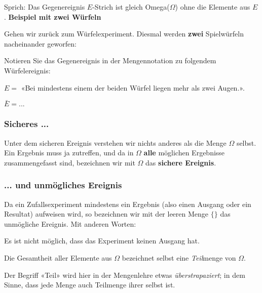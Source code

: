 Sprich: Das Gegenereignis $E$-Strich ist gleich Omega($\Omega$) ohne die Elemente
aus $E$.
\newpage
\textbf{Beispiel mit zwei Würfeln}


Gehen wir zurück zum Würfelexperiment. Diesmal werden
\textbf{zwei} Spielwürfeln nacheinander geworfen:

Notieren Sie das Gegenereignis in der Mengennotation zu folgendem
Würfelereignis:

$E=$ «Bei mindestens einem der beiden Würfel liegen
mehr als zwei Augen.».

$\bar{E} = ...$


\subsubsection{Sicheres ...}
Unter dem sicheren Ereignis verstehen wir nichts anderes als die Menge
$\Omega$ selbst. Ein Ergebnis muss ja zutreffen, und da in $\Omega$
\textbf{alle} möglichen Ergebnisse zusammengefasst sind, bezeichnen
wir mit $\Omega$ das \textbf{sichere Ereignis}.

\subsubsection{... und unmögliches Ereignis}
Da ein Zufallsexperiment mindestens ein Ergebnis (also einen Ausgang
oder ein Resultat) aufweisen wird, so bezeichnen wir mit der leeren
Menge $\{\}$ das unmögliche Ereignis. Mit anderen Worten:

Es ist nicht möglich, dass das Experiment keinen Ausgang hat.


\begin{bemerkung}{}{}
Die Gesamtheit aller Elemente aus $\Omega$ bezeichnet selbst eine
\textit{Teil}menge von $\Omega$.

Der Begriff «Teil» wird hier in der Mengenlehre etwas \textit{überstrapaziert}; in dem Sinne, dass jede Menge auch
  Teilmenge ihrer selbst ist.
\end{bemerkung}

